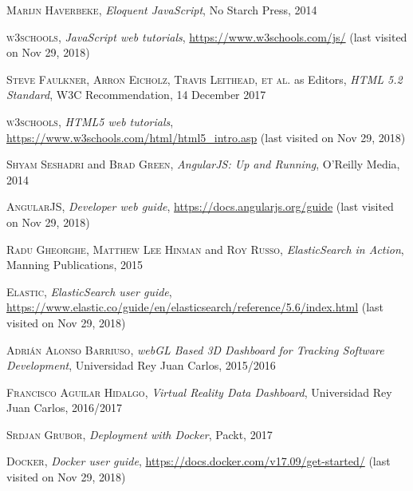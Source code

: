 \documentclass[a4paper, 12pt]{book}
\begin{document}

\begin{thebibliography}{X}
 \textsc{Marijn Haverbeke},
\textit{Eloquent JavaScript}, No Starch Press, 2014

 \textsc{w3schools},
\textit{JavaScript web tutorials}, \url{https://www.w3schools.com/js/} (last visited on Nov 29, 2018)

 \textsc{Steve Faulkner, Arron Eicholz, Travis Leithead, et al.} as Editors, \textit{HTML 5.2 Standard}, W3C Recommendation, 14 December 2017

 \textsc{w3schools},
\textit{HTML5 web tutorials}, \url{https://www.w3schools.com/html/html5_intro.asp} (last visited on Nov 29, 2018)

 \textsc{Shyam Seshadri} and \textsc{Brad Green}, \textit{AngularJS: Up and Running}, O’Reilly Media, 2014

 \textsc{AngularJS},
\textit{Developer web guide}, \url{https://docs.angularjs.org/guide} (last visited on Nov 29, 2018)

 \textsc{Radu Gheorghe}, \textsc{Matthew Lee Hinman} and \textsc{Roy Russo}, \textit{ElasticSearch in Action},  Manning Publications, 2015

 \textsc{Elastic},
\textit{ElasticSearch user guide}, \url{https://www.elastic.co/guide/en/elasticsearch/reference/5.6/index.html} (last visited on Nov 29, 2018)

 \textsc{Adri\'an Alonso Barriuso}, \textit{webGL Based 3D Dashboard for Tracking Software
Development},  Universidad Rey Juan Carlos, 2015/2016

 \textsc{Francisco Aguilar Hidalgo}, \textit{Virtual Reality Data Dashboard},  Universidad Rey Juan Carlos, 2016/2017

 \textsc{Srdjan Grubor}, \textit{Deployment with Docker}, Packt, 2017

 \textsc{Docker},
\textit{Docker user guide}, \url{https://docs.docker.com/v17.09/get-started/} (last visited on Nov 29, 2018)

\end{thebibliography}


\end{document}
